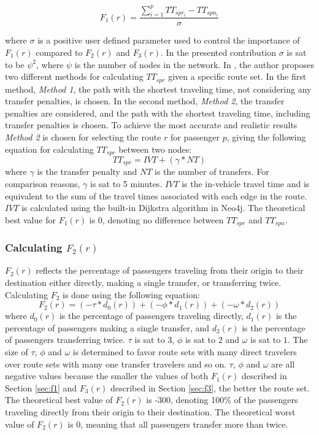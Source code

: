 $$F_{1}(r) = \frac{\sum\limits^{p}_{i=1}TT_{spr_i}-TT_{spn_i}}{\sigma}$$

where $\sigma$ is a positive user defined parameter used to control the importance of $F_{1}(r)$ compared to $F_{2}(r)$ and $F_{3}(r)$. In the presented contribution $\sigma$ is sat to be $\psi^2$, where $\psi$ is the number of nodes in the network. In \citet{fan09}, the author proposes two different methods for calculating $TT_{spr}$ given a specific route set. In the first method, \textit{Method 1}, the path with the shortest traveling time, not considering any transfer penalties, is chosen. In the second method, \textit{Method 2}, the transfer penalties are considered, and the path with the shortest traveling time, including transfer penalties is chosen. To achieve the most accurate and realistic results \textit{Method 2} is chosen for selecting the route $r$ for passenger $p$, giving the following equation for calculating $TT_{spr}$ between two nodes: 
\newline
$$TT_{spr} = IVT + (\gamma*NT)$$
\newline
where $\gamma$ is the transfer penalty and $NT$ is the number of transfers. For comparison reasons, $\gamma$ is sat to 5 minutes. $IVT$ is the in-vehicle travel time and is equivalent to the sum of the travel times associated with each edge in the route. $IVT$ is calculated using the built-in Dijkstra algorithm in Neo4j. The theoretical best value for $F_{1}(r)$ is 0, denoting no difference between $TT_{spr}$ and $TT_{spn}$.

\subsubsection{Calculating $F_{2}(r)$}
\label{sec:f2}
$F_{2}(r)$ reflects the percentage of passengers traveling from their origin to their destination either directly, making a single transfer, or transferring twice. Calculating $F_{2}$ is done using the following equation: 
\newline
$$F_2(r) = (-\tau*d_0(r)) + (-\phi*d_1(r)) + (-\omega*d_2(r))$$
\newline
where $d_0(r)$ is the percentage of passengers traveling directly, $d_1(r)$ is the percentage of passengers making a single transfer, and $d_2(r)$ is the percentage of passengers transferring twice. $\tau$ is sat to $3$, $\phi$ is sat to $2$ and $\omega$ is sat to $1$. The size of $\tau$, $\phi$ and  $\omega$  is determined to favor route sets with many direct travelers over route sets with many one transfer travelers and so on.
$\tau$, $\phi$ and $\omega$ are all negative values because the smaller the values of both $F_{1}(r)$ described in Section \vref{sec:f1} and $F_{3}(r)$ described in Section \vref{sec:f3}, the better the route set. The theoretical best value of $F_{2}(r)$ is -300, denoting 100\% of the passengers traveling directly from their origin to their destination. The theoretical worst value of $F_{2}(r)$ is 0, meaning that all passengers transfer more than twice.

